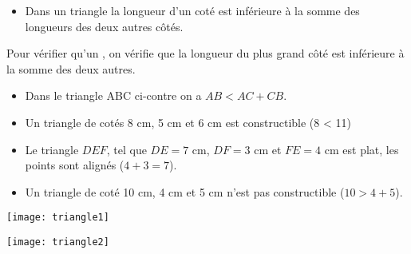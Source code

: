 \begin{myprop}
	\begin{itemize}
		\item Dans un triangle la longueur d'un coté est inférieure à la somme des longueurs des deux autres côtés.
		
	\end{itemize}
	
\end{myprop}

\begin{mymeth}
	Pour vérifier qu'un , on vérifie que la longueur du plus grand côté  est inférieure à la somme des deux autres.
\end{mymeth}

\begin{myexs}
	\begin{multicols}{2}
		\begin{itemize}
			\item Dans le triangle ABC ci-contre on a $AB < AC + CB.$
			\item Un triangle de cotés 8 cm, 5 cm et 6 cm est constructible (8 < 11)
			
			\item Le triangle $DEF$, tel que $DE = 7$ cm, $DF = 3$ cm et $FE = 4$ cm est plat, les points sont alignés ($4 + 3 = 7$).
			
			\item Un triangle de coté 10 cm, 4 cm et 5 cm n'est pas constructible ($10 > 4 + 5$).
		\end{itemize}
		
		
		\begin{center}
			\texttt{[image: triangle1]}
		
		\texttt{[image: triangle2]}
		\end{center}
	\end{multicols}
\end{myexs}

